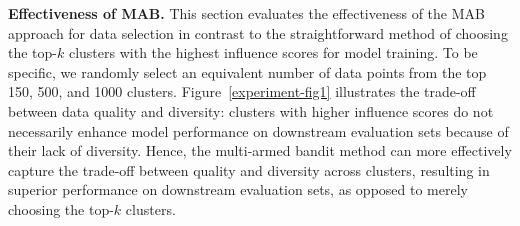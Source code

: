 \documentclass{article} %
\begin{document}
\textbf{Effectiveness of MAB.}
This section evaluates the effectiveness of the MAB approach for data selection in contrast to the straightforward method of choosing the top-$k$ clusters with the highest influence scores for model training. To be specific, we randomly select an equivalent number of data points from the top 150, 500, and 1000 clusters.  Figure~\ref{experiment-fig1} illustrates the trade-off between data quality and diversity: clusters with higher influence scores do not necessarily enhance model performance on downstream evaluation sets because of their lack of diversity. Hence, the multi-armed bandit method can more effectively capture the trade-off between quality and diversity across clusters, resulting in  superior performance on downstream evaluation sets, as opposed to merely choosing the top-$k$ clusters.%

\end{document}
